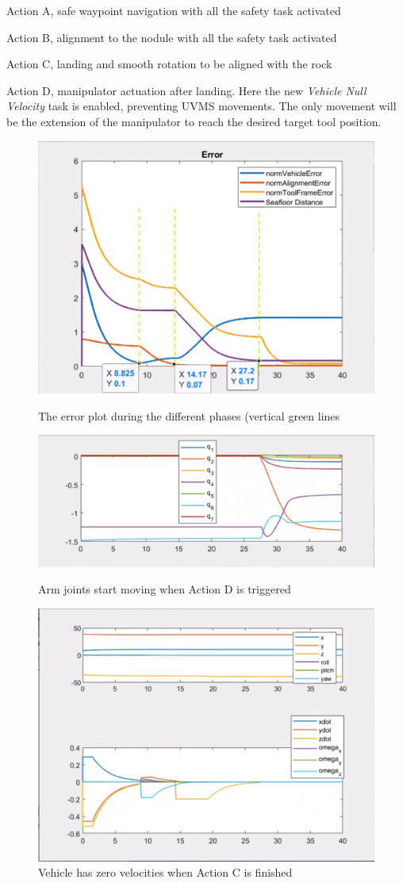 \documentclass{article}
\begin{document}
\begin{description}
 \item Action A, safe waypoint navigation with all the safety task activated
 \item Action B, alignment to the nodule with all the safety task activated
 \item Action C, landing and smooth rotation to be aligned with the rock
 \item Action D, manipulator actuation after landing. Here the new \textit{Vehicle Null Velocity} task is enabled, preventing UVMS movements. The only movement will be the extension of the manipulator to reach the desired target tool position.
\end{description}

\begin{figure}[htp]
\centering

\includegraphics[width=.6\textwidth]{411_Errors.png}\caption{The error plot during the different phases (vertical green lines}
\label{fig:411_errors}
\includegraphics[width=.6\textwidth]{411_q.png}\caption{Arm joints start moving when Action D is triggered}
\centering
\label{fig:411_arm}
\includegraphics[width=.6\textwidth]{411_ppdot.png}\caption{Vehicle has zero velocities when Action C is finished}
\label{fig:411_vehicle}
\end{figure}
\end{document}
